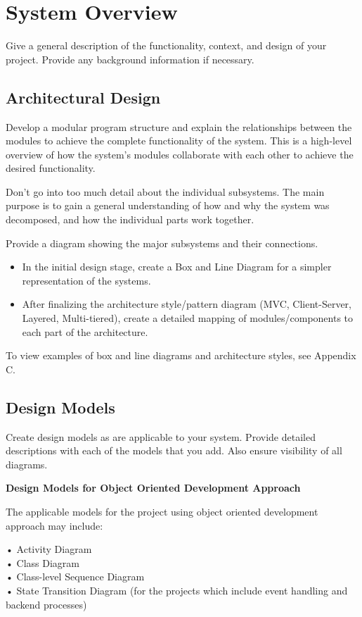\chapter{System Overview}

Give a general description of the functionality, context, and design of your project.
Provide any background information if necessary.
\section{Architectural Design}
Develop a modular program structure and explain the relationships between the modules to achieve the complete functionality of the system. This is a high-level overview of how the system’s modules collaborate with each other to achieve the desired functionality. 

Don’t go into too much detail about the individual subsystems. The main purpose is to gain a general understanding of how and why the system was decomposed, and how the individual parts work together.

Provide a diagram showing the major subsystems and their connections.

\begin{itemize}
    \item In the initial design stage, create a Box and Line Diagram for a simpler representation of the systems.
    \item After finalizing the architecture style/pattern diagram (MVC, Client-Server, Layered, Multi-tiered), create a detailed mapping of modules/components to each part of the architecture.
\end{itemize}

To view examples of box and line diagrams and architecture styles, see Appendix C.

\section{Design Models}
Create design models as are applicable to your system. Provide detailed descriptions with each of the models that you add. Also ensure visibility of all diagrams. 

\textbf{Design Models for Object Oriented Development Approach}

The applicable models for the project using object oriented development approach may include:

•	Activity Diagram\\
•	Class Diagram\\
•	Class-level Sequence Diagram\\
•	State Transition Diagram (for the projects which include event handling and backend processes)\\

